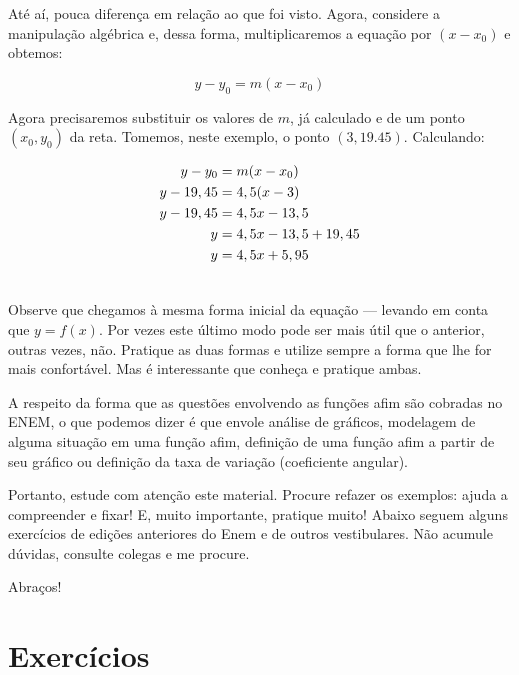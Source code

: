 \documentclass[12pt, a4paper, brazil]{abntex2}
\begin{document}
    Até aí, pouca diferença em relação ao que foi visto. Agora, considere a manipulação algébrica e, dessa forma, multiplicaremos a equação por $(x - x_0)$ e obtemos:

        \begin{equation}
            y - y_0 = m (x - x_0)
        \end{equation}

    Agora precisaremos substituir os valores de $m$, já calculado e de um ponto $(x_0,y_0)$ da reta. Tomemos, neste exemplo, o ponto $(3, 19.45)$. Calculando:

        \begin{equation*}
            \begin{aligned}
                y-y_0 &= m (x - x_0)\\
                y - 19,45 &= 4,5(x - 3)\\
                y - 19,45 &= 4,5x - 13,5\\
                y &= 4,5x -13,5 + 19,45\\
                y &= 4,5x + 5,95\\
                \vspace{6pt}
            \end{aligned}
        \end{equation*}

    Observe que chegamos à mesma forma inicial da equação --- levando em conta que $y=f(x)$. Por vezes este último modo pode ser mais útil que o anterior, outras vezes, não. Pratique as duas formas e utilize sempre a forma que lhe for mais confortável. Mas é interessante que conheça e pratique ambas.

    A respeito da forma que as questões envolvendo as funções afim são cobradas no ENEM, o que podemos dizer é que envole análise de gráficos, modelagem de alguma situação em uma função afim, definição de uma função afim a partir de seu gráfico ou definição da taxa de variação (coeficiente angular).

    Portanto, estude com atenção este material. Procure refazer os exemplos: ajuda a compreender e fixar! E, muito importante, pratique muito! Abaixo seguem alguns exercícios de edições anteriores do Enem e de outros vestibulares. Não acumule dúvidas, consulte colegas e me procure.

    Abraços!


    \newpage
    \section*{Exercícios}
\end{document}
